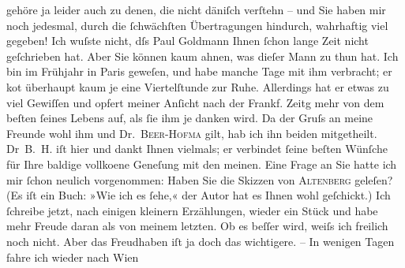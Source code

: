 \begin{ledgroupsized}[t]{13cm}
                    gehöre ja leider auch zu denen, die nicht däniſch verſtehn – und Sie haben mir noch jedesmal, durch die
                    ſchwächſten Übertragungen hindurch, wahrhaftig {\pb}viel gegeben!\pend
           \pstart
           Ich wuſste nicht, dſs Paul Goldmann Ihnen
                    ſchon lange Zeit nicht geſchrieben hat. Aber Sie können kaum ahnen, was dieſer
                    Mann zu thun hat. Ich bin im Frühjahr in Paris
                    geweſen, und habe manche Tage mit ihm verbracht; er ko{\geminationm}t überhaupt kaum je eine Viertelſtunde zur Ruhe.
                    Allerdings hat er etwas zu viel Gewiſſen und opfert meiner An{\pb}ſicht nach der Frankf. Zeitg mehr von dem beſten ſeines Lebens auf, als ſie ihm je
                    danken wird. Da der Gruſs an meine Freunde wohl ihm und Dr. \textsc{Beer-Hofma{\geminationn}} gilt, hab ich ihn beiden mitgetheilt. Dr \textsc{B. H.} iſt hier und dankt Ihnen vielmals; er
                    verbindet ſeine beſten Wünſche für Ihre baldige vollko{\geminationm}ene Geneſung mit den meinen.\pend
           \pstart
           {\pb}Eine Frage an Sie hatte ich mir ſchon
                    neulich vorgenommen: Haben Sie die Skizzen von \textsc{Altenberg} geleſen? (Es iſt ein Buch: »Wie ich es ſehe,« der Autor hat es Ihnen wohl
                    geſchickt.)\pend
           \pstart
           Ich ſchreibe jetzt, nach einigen kleinern Erzählungen, wieder ein Stück und habe
                    mehr Freude daran als von meinem letzten. Ob es beſſer wird,  weiſs ich freilich {\pb}noch nicht. Aber das Freudhaben iſt ja doch
                    das wichtigere. –\pend
           \pstart
           In wenigen Tagen fahre ich wieder nach Wien

\end{ledgroupsized}
